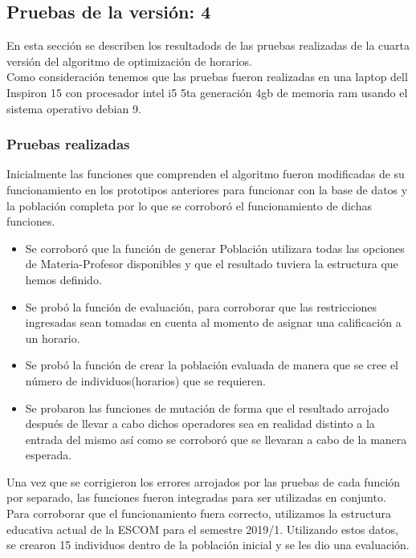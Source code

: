 \subsection{Pruebas de la versión: 4} \label{chp:pruebasV1}
En esta sección se describen los resultadods de las pruebas realizadas de la cuarta versión del algoritmo de optimización de horarios.\\

Como consideración tenemos que las pruebas fueron realizadas en una laptop dell Inspiron 15 con procesador intel i5 5ta generación 4gb de memoria ram usando el sistema operativo debian 9.\\


\subsubsection{Pruebas realizadas}

Inicialmente las funciones que comprenden el algoritmo fueron modificadas de su funcionamiento en los prototipos anteriores para funcionar con la base de datos y la población completa por lo que se corroboró el funcionamiento de dichas funciones. \\

\begin{itemize}
	\item Se corroboró que la función de generar Población utilizara todas las opciones de Materia-Profesor disponibles y que el resultado tuviera la estructura que hemos definido. 
	
	\item Se probó la función de evaluación, para corroborar que las restricciones ingresadas sean tomadas en cuenta al momento de asignar una calificación a un horario.
	
	\item Se probó la función de crear la población evaluada de manera que se cree el número de individuos(horarios) que se requieren.
	
	\item Se probaron las funciones de mutación de forma que el resultado arrojado después de llevar a cabo dichos operadores sea en realidad distinto a la entrada del mismo así como se corroboró que se llevaran a cabo de la manera esperada.
	
\end{itemize}

Una vez que se corrigieron los errores arrojados por las pruebas de cada función por separado, las funciones fueron integradas para ser utilizadas en conjunto. Para corroborar que el funcionamiento fuera correcto, utilizamos la estructura educativa actual de la ESCOM para el semestre 2019/1. Utilizando estos datos, se crearon 15 individuos dentro de la población inicial y se les dio una evaluación.\\


